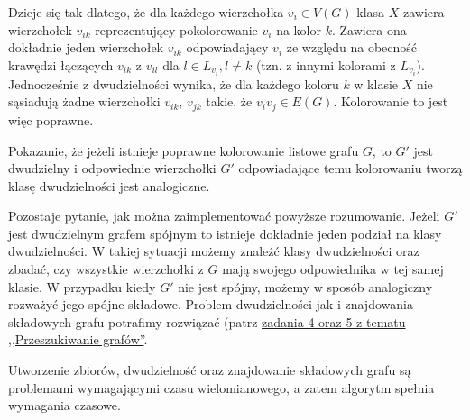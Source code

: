 Dzieje się tak dlatego, że dla każdego wierzchołka $v_i\in V(G)$ klasa $X$ zawiera wierzchołek $v_{ik}$ reprezentujący pokolorowanie $v_i$ na kolor $k$. Zawiera ona dokładnie jeden wierzchołek $v_{ik}$ odpowiadający $v_i$ ze względu na obecność krawędzi łączących $v_{ik}$ z $v_{il}$ dla $l \in L_{v_i}, l \neq k$ (tzn. z innymi kolorami z $L_{v_i}$). Jednocześnie z dwudzielności wynika, że dla każdego koloru $k$ w klasie $X$ nie sąsiadują żadne wierzchołki $v_{ik}$, $v_{jk}$ takie, że $v_iv_j\in E(G)$. Kolorowanie to jest więc poprawne.

Pokazanie, że jeżeli istnieje poprawne kolorowanie listowe grafu $G$, to $G'$ jest dwudzielny i odpowiednie wierzchołki $G'$ odpowiadające temu kolorowaniu tworzą klasę dwudzielności jest analogiczne. 

Pozostaje pytanie, jak można zaimplementować powyższe rozumowanie. Jeżeli $G'$ jest dwudzielnym grafem spójnym to istnieje dokładnie jeden podział na klasy dwudzielności. W takiej sytuacji możemy znaleźć klasy dwudzielności oraz zbadać, czy wszystkie wierzchołki z $G$ mają swojego odpowiednika w tej samej klasie. W przypadku kiedy $G'$ nie jest spójny, możemy w sposób analogiczny rozważyć jego spójne składowe. Problem dwudzielności jak i znajdowania składowych grafu potrafimy rozwiązać (patrz \hyperref[exc:bipart]{zadania 4 oraz 5 z tematu ,,Przeszukiwanie grafów''}.

Utworzenie zbiorów, dwudzielność oraz znajdowanie składowych grafu są problemami wymagającymi czasu wielomianowego, a zatem algorytm spełnia wymagania czasowe.

